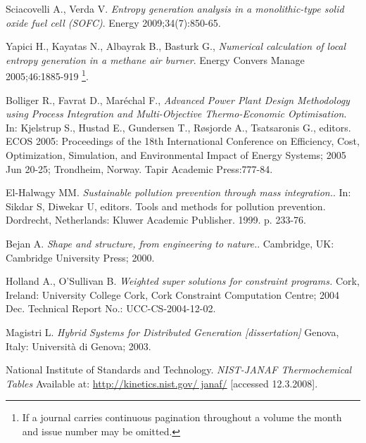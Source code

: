 \documentclass{ECOS_2021}
\begin{document}
\sffamily \Large
\begin{thebibliography}{99}
\rmfamily \normalsize

 Sciacovelli A., Verda V.
\textit{Entropy generation analysis in a monolithic-type solid oxide fuel cell (SOFC)}. Energy 2009;34(7):850-65.

 Yapici H., Kayatas N., Albayrak B., Basturk G.,
\textit{Numerical calculation of local entropy generation in a methane air burner}. Energy Convers Manage 2005;46:1885-919 \footnote{If a journal carries continuous pagination throughout a volume the month and issue number may be omitted.}.

 Bolliger R., Favrat D., Maréchal F.,
\textit{Advanced Power Plant Design Methodology using Process Integration and Multi-Objective Thermo-Economic Optimisation}. In: Kjelstrup S., Hustad E., Gundersen T., Røsjorde A., Tsatsaronis G., editors. ECOS 2005: Proceedings of the 18th International Conference on Efficiency, Cost, Optimization, Simulation, and Environmental Impact of Energy Systems; 2005 Jun 20-25; Trondheim, Norway. Tapir Academic Press:777-84.

  El-Halwagy MM.
\textit{Sustainable pollution prevention through mass integration.}. In: Sikdar S, Diwekar U, editors. Tools and methods for pollution prevention. Dordrecht, Netherlands: Kluwer Academic Publisher. 1999. p. 233-76.

  Bejan A.
\textit{Shape and structure, from engineering to nature.}. Cambridge, UK: Cambridge University Press; 2000.

  Holland A., O’Sullivan B.
\textit{Weighted super solutions for constraint programs.} Cork, Ireland: University College Cork, Cork Constraint Computation Centre; 2004 Dec. Technical Report No.: UCC-CS-2004-12-02.

  Magistri L.
\textit{Hybrid Systems for Distributed Generation [dissertation]} Genova, Italy: Università  di Genova; 2003.

  National Institute of Standards and Technology.
\textit{NIST-JANAF Thermochemical Tables} Available at: \url{http://kinetics.nist.gov/ janaf/} [accessed 12.3.2008].
\end{thebibliography}
\end{document}
